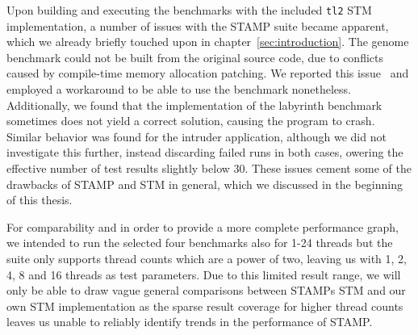 Upon building and executing the benchmarks with the included \texttt{tl2} STM implementation, a number of issues with the STAMP suite became apparent, which we already briefly touched upon in chapter~\ref{sec:introduction}.
The genome benchmark could not be built from the original source code, due to conflicts caused by compile-time memory allocation patching.
We reported this issue~\cite{wittwer2020stampgenome} and employed a workaround to be able to use the benchmark nonetheless.
Additionally, we found that the implementation of the labyrinth benchmark sometimes does not yield a correct solution, causing the program to crash.
Similar behavior was found for the intruder application, although we did not investigate this further, instead discarding failed runs in both cases, owering the effective number of test results slightly below 30.
These issues cement some of the drawbacks of STAMP and STM in general, which we discussed in the beginning of this thesis.

For comparability and in order to provide a more complete performance graph, we intended to run the selected four benchmarks also for 1-24 threads but the suite only supports thread counts which are a power of two, leaving us with 1, 2, 4, 8 and 16 threads as test parameters.
Due to this limited result range, we will only be able to draw vague general comparisons between STAMPs STM and our own STM implementation as the sparse result coverage for higher thread counts leaves us unable to reliably identify trends in the performance of STAMP.

